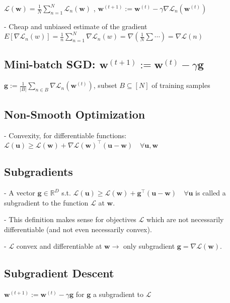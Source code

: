 $
\mathcal{L}(\mathbf{w})=\frac{1}{N} \sum_{n=1}^{N} \mathcal{L}_{n}(\mathbf{w})
$
,
$
\mathbf{w}^{(t+1)}:=\mathbf{w}^{(t)}-\gamma \nabla \mathcal{L}_{n}(\mathbf{w}^{(t)})
$

- Cheap and unbiased estimate of the gradient
$E[\nabla \mathcal{L}_n(w)]=\frac1n\sum_{n=1}^N\nabla \mathcal{L}_n(w)=\nabla(\frac1N\sum\cdots)=\nabla \mathcal{L}(n)$

\subsection*{Mini-batch SGD: $
\mathbf{w}^{(t+1)}:=\mathbf{w}^{(t)}-\gamma \mathbf{g}
$}

$
\mathbf{g}:=\frac{1}{|B|} \sum_{n \in B} \nabla \mathcal{L}_{n}(\mathbf{w}^{(t)})
$, subset $B \subseteq[N]$ of training samples



\subsection*{Non-Smooth Optimization}
- Convexity, for differentiable functions:
$\mathcal{L}(\mathbf{u}) \geq \mathcal{L}(\mathbf{w})+\nabla \mathcal{L}(\mathbf{w})^{\top}(\mathbf{u}-\mathbf{w}) \quad \forall \mathbf{u}, \mathbf{w}$ 

\subsection*{Subgradients}
- A vector $\mathbf{g} \in \mathbb{R}^{D}$ s.t.
$
\mathcal{L}(\mathbf{u}) \geq \mathcal{L}(\mathbf{w})+\mathbf{g}^{\top}(\mathbf{u}-\mathbf{w}) \quad \forall \mathbf{u}
$
is called a subgradient to the function $\mathcal{L}$ at $\mathbf{w}$.

- This definition makes sense for objectives $\mathcal{L}$ which are not necessarily differentiable (and not even necessarily convex).

- $\mathcal{L}$ convex and differentiable at $\mathbf{w}\rightarrow$ only subgradient $\mathbf{g}=\nabla \mathcal{L}(\mathbf{w})$.

\subsection*{Subgradient Descent}
$
\mathbf{w}^{(t+1)}:=\mathbf{w}^{(t)}-\gamma \mathbf{g}
$
for $\mathbf{g}$ a subgradient to $\mathcal{L}$

